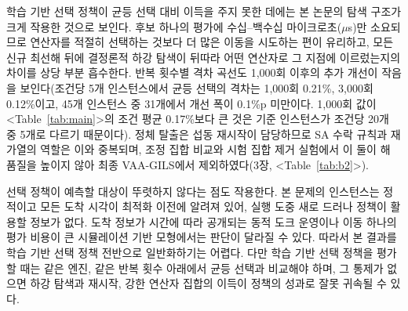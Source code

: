 \documentclass[10pt,a4paper]{article}
\begin{document}
학습 기반 선택 정책이 균등 선택 대비 이득을 주지 못한 데에는 본 논문의 탐색 구조가 크게 작용한 것으로 보인다. 후보 하나의 평가에 수십--백수십 마이크로초($\mu$s)만 소요되므로 연산자를 적절히 선택하는 것보다 더 많은 이동을 시도하는 편이 유리하고, 모든 신규 최선해 뒤에
결정론적 하강 탐색이 뒤따라 어떤 연산자로 그 지점에 이르렀는지의 차이를 상당 부분
흡수한다. 반복 횟수별 격차 곡선도 1{,}000회 이후의 추가 개선이 작음을 보인다(조건당 5개 인스턴스에서
균등 선택의 격차는 1{,}000회 0.21\%, 3{,}000회 0.12\%이고, 45개 인스턴스 중 31개에서 개선 폭이 0.1\%p 미만이다.
1{,}000회 값이 <Table~\ref{tab:main}>의 조건 평균 0.17\%보다 큰 것은 기준 인스턴스가 조건당 20개 중 5개로 다르기 때문이다).
정체 탈출은 섭동 재시작이 담당하므로 SA 수락 규칙과 재가열의 역할은
이와 중복되며, 조정 집합 비교와 시험 집합 제거 실험에서 이 둘이 해 품질을 높이지 않아 최종
VAA-GILS에서 제외하였다(3장, <Table~\ref{tab:b2}>).

선택 정책이 예측할 대상이 뚜렷하지 않다는 점도 작용한다. 본 문제의 인스턴스는 정적이고
모든 도착 시각이 최적화 이전에 알려져 있어, 실행 도중 새로 드러나 정책이 활용할
정보가 없다. 도착 정보가 시간에 따라 공개되는 동적 도크 운영이나 이동 하나의 평가 비용이 큰 시뮬레이션 기반 모형에서는 판단이 달라질 수 있다. 따라서 본 결과를 학습 기반 선택 정책 전반으로 일반화하기는 어렵다. 다만 학습 기반 선택 정책을 평가할 때는 같은 엔진, 같은 반복 횟수 아래에서 균등 선택과 비교해야 하며, 그 통제가 없으면 하강 탐색과 재시작, 강한 연산자 집합의 이득이 정책의 성과로 잘못 귀속될 수 있다.
\end{document}
